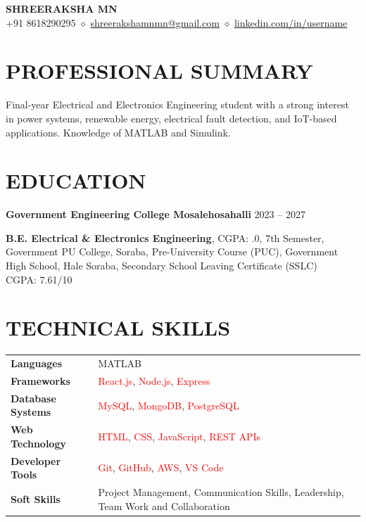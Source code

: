 \documentclass[9.5pt,a4paper]{extarticle}
\begin{document}
\begin{center}
{\Large \textbf{SHREERAKSHA MN}} \\ \vspace{2pt}
+91 8618290295 $\diamond$ \href{mailto:shreerakshamnmn@gmail.com}{shreerakshamnmn@gmail.com} $\diamond$ \href{https://linkedin.com/in/username}{linkedin.com/in/username}
\end{center}

\section*{PROFESSIONAL SUMMARY}
Final-year Electrical and Electronics Engineering student with a strong interest in power systems, renewable energy, electrical fault detection, and IoT-based applications. Knowledge of MATLAB and Simulink.

\section*{EDUCATION}
\noindent \textbf{Government Engineering College Mosalehosahalli} \hfill 2023 – 2027 \\ \vspace{4pt}

\noindent \textbf{B.E. Electrical \& Electronics Engineering}, CGPA: .0, 7th Semester, Government PU College, Soraba, Pre-University Course (PUC), Government High School, Hale Soraba, Secondary School Leaving Certificate (SSLC) \\
\null \hfill CGPA: 7.61/10 \vspace{4pt}


\section*{TECHNICAL SKILLS}
\begin{tabular}{@{}p{1.5in}p{5.4in}@{}}
\textbf{Languages} & MATLAB \\
\textbf{Frameworks} & \textcolor{red}{React.js}, \textcolor{red}{Node.js}, \textcolor{red}{Express} \\
\textbf{Database Systems} & \textcolor{red}{MySQL}, \textcolor{red}{MongoDB}, \textcolor{red}{PostgreSQL} \\
\textbf{Web Technology} & \textcolor{red}{HTML}, \textcolor{red}{CSS}, \textcolor{red}{JavaScript}, \textcolor{red}{REST APIs} \\
\textbf{Developer Tools} & \textcolor{red}{Git}, \textcolor{red}{GitHub}, \textcolor{red}{AWS}, \textcolor{red}{VS Code} \\
\textbf{Soft Skills} & Project Management, Communication Skills, Leadership, Team Work and Collaboration \\
\end{tabular}
\end{document}
